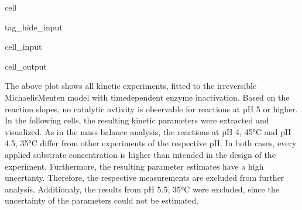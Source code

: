 \documentclass[letterpaper,10pt,english]{jupyterBook}
\begin{document}
\begin{sphinxuseclass}{cell}
\begin{sphinxuseclass}{tag_hide_input}
\begin{sphinxVerbatimInput}
\begin{sphinxuseclass}{cell_input}
\end{sphinxuseclass}\end{sphinxVerbatimInput}
\begin{sphinxVerbatimOutput}

\begin{sphinxuseclass}{cell_output}
\noindent{}

\end{sphinxuseclass}\end{sphinxVerbatimOutput}

\end{sphinxuseclass}
\end{sphinxuseclass}
\sphinxAtStartPar
The above plot shows all kinetic experiments, fitted to the irreversible Michaelis\sphinxhyphen{}Menten model with time\sphinxhyphen{}dependent enzyme inactivation. Based on the reaction slopes, no catalytic avtivity is observable for reactions at pH 5 or higher.
In the following cells, the resulting kinetic parameters were extracted and visualized. As in the mass balance analysis, the reactions at pH 4, 45°C and pH 4.5, 35°C differ from other experiments of the respective pH. In both cases, every applied substrate concentration is higher than intended in the design of the experiment. Furthermore, the resulting parameter estimates have a high uncertanty. Therefore, the respective measurements are excluded from further analysis. Additionaly, the results from pH 5.5, 35°C were excluded, since the uncertainty of the parameters could not be estimated.
\end{document}
